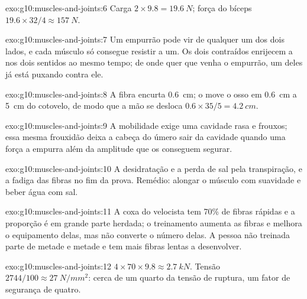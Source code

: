 \begin{solution}{exo:g10:muscles-and-joints:6}
Carga $2 \times 9.8 = \qty{19.6}{N}$; força do bíceps $19.6 \times 32/4
\approx \qty{157}{N}$.
\end{solution}

\begin{solution}{exo:g10:muscles-and-joints:7}
Um empurrão pode vir de qualquer um dos dois lados, e cada músculo só
consegue resistir a um. Os dois contraídos enrijecem a  nos
dois sentidos ao mesmo tempo; de onde quer que venha o empurrão, um
deles já está puxando contra ele.
\end{solution}

\begin{solution}{exo:g10:muscles-and-joints:8}
A fibra encurta \qty{0.6}{cm}; o  move o osso em \qty{0.6}{cm} a
\qty{5}{cm} do cotovelo, de modo que a mão se desloca
$0.6 \times 35/5 = \qty{4.2}{cm}$.
\end{solution}

\begin{solution}{exo:g10:muscles-and-joints:9}
A mobilidade exige uma cavidade rasa e  frouxos; essa mesma
frouxidão deixa a cabeça do úmero sair da cavidade quando uma força a
empurra além da amplitude que os  conseguem segurar.
\end{solution}

\begin{solution}{exo:g10:muscles-and-joints:10}
A desidratação e a perda de sal pela transpiração, e a fadiga das
fibras no fim da prova. Remédio: alongar o músculo com suavidade e
beber água com sal.
\end{solution}

\begin{solution}{exo:g10:muscles-and-joints:11}
A coxa do velocista tem 70\% de fibras rápidas e a proporção é em
grande parte herdada; o treinamento aumenta as fibras e melhora o
equipamento delas, mas não converte o número delas. A pessoa não
treinada parte de metade e metade e tem mais fibras lentas a
desenvolver.
\end{solution}

\begin{solution}{exo:g10:muscles-and-joints:12}
$4 \times 70 \times 9.8 \approx \qty{2.7}{kN}$. Tensão $2744/100
\approx \qty{27}{N/mm^2}$: cerca de um quarto da tensão de ruptura, um
fator de segurança de quatro.
\end{solution}


